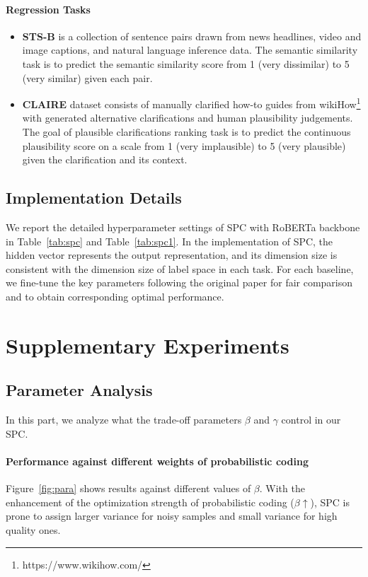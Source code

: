 \documentclass[letterpaper]{article} %
\begin{document}
\paragraph{Regression Tasks}
\begin{itemize}
    \item 
    \textbf{STS-B} \cite{DBLP:conf/semeval/CerDALS17} is a collection of sentence pairs drawn from news headlines, video and image captions, and natural language inference data. The semantic similarity task is to predict the semantic similarity score from 1 (very dissimilar) to 5 (very similar) given each pair.
    \item   \textbf{CLAIRE} \cite{DBLP:conf/semeval/RothAS22} 
     dataset consists of manually clarified how-to guides from wikiHow\footnote{https://www.wikihow.com/} with generated alternative clarifications and human plausibility judgements.
    The goal of plausible clarifications ranking task is to predict the continuous plausibility score on a scale from 1 (very implausible) to 5 (very plausible) given the clarification and its context.
\end{itemize}





\subsection{Implementation Details}
We report the detailed hyperparameter settings of SPC with RoBERTa backbone in Table~\ref{tab:spc} and Table~\ref{tab:spc1}.
In the implementation of SPC, the hidden vector represents the output representation, and its dimension size is consistent with the dimension size of label space in each task. For each baseline, we fine-tune the key parameters following the original paper for fair comparison and to obtain corresponding optimal performance.

\section{Supplementary Experiments}
\subsection{Parameter Analysis}
In this part, we analyze what the trade-off parameters $\beta$ and $\gamma$ control in our SPC.


\paragraph{Performance against different weights of probabilistic coding}
Figure~\ref{fig:para} shows results against different values of $\beta$. With the enhancement of the optimization strength of probabilistic coding ($\beta \uparrow$), SPC is prone to assign larger variance for noisy samples and small variance for high quality ones. 
\end{document}
